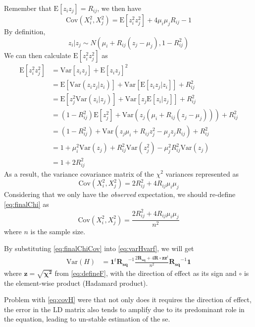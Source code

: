 \documentclass{book}
\begin{document}
			Remember that $\mathrm{E}[z_iz_j] = R_{ij}$, we then have
			$$
				\mathrm{Cov}(X_i^2, X_j^2)=\mathrm{E}[z_i^2z_j^2]+4\mu_i\mu_jR_{ij}-1
			$$
			By definition, 
			$$
				z_i|z_j\sim N(\mu_i+R_{ij}(z_j-\mu_j),1-R_{ij}^2)
			$$
			We can then calculate $\mathrm{E}[z_i^2z_j^2]$ as
			\begin{align*}
				\mathrm{E}[z_i^2z_j^2]&=\mathrm{Var}[z_iz_j]+\mathrm{E}[z_iz_j]^2\\
				&=\mathrm{E}[\mathrm{Var}(z_iz_j|z_i)]+\mathrm{Var}[\mathrm{E}[z_iz_j|z_i]]+R_{ij}^2\\
				&=\mathrm{E}[z_j^2\mathrm{Var}(z_i|z_j)]+\mathrm{Var}[z_j\mathrm{E}[z_i|z_j]]+R_{ij}^2\\
				&=(1-R_{ij}^2)\mathrm{E}[z_j^2]+\mathrm{Var}(z_j(\mu_i+R_{ij}(z_j-\mu_j)))+R_{ij}^2\\
				&=(1-R_{ij}^2)+\mathrm{Var}(z_j\mu_i+R_{ij}z_j^2-\mu_jz_jR_{ij})+R_{ij}^2\\
				&=1+\mu_i^2\mathrm{Var}(z_j)+R_{ij}^2\mathrm{Var}(z_j^2)-\mu_j^2R_{ij}^2\mathrm{Var}(z_j)\\
				&=1+2R_{ij}^2
			\end{align*}
			As a result, the variance covariance matrix of the $\chi^2$ variances represented as
			\begin{equation}
				\mathrm{Cov}(X_i^2,X_j^2) = 2R_{ij}^2+4R_{ij}\mu_i\mu_j
				\label{eq:finalChi}
			\end{equation}
			Considering that we only have the \emph{observed} expectation, we should re-define \cref{eq:finalChi} as
			\begin{equation}
				\mathrm{Cov}(X_i^2,X_j^2) = \frac{2R_{ij}^2+4R_{ij}\mu_i\mu_j}{n^2}
				\label{eq:finalChiCov}
			\end{equation}
			where $n$ is the sample size.
			
			By substituting \cref{eq:finalChiCov} into \cref{eq:varHvarf}, we will get
			\begin{align}
				\mathrm{Var}(H) &=\boldsymbol{1}^t\boldsymbol{R_{sq}}^{-1}\frac{2\boldsymbol{R_{sq}}+4\boldsymbol{R}\circ \boldsymbol{zz}^t}{n^2}\boldsymbol{R_{sq}}^{-1}\boldsymbol{1}
				\label{eq:covH}
			\end{align}
			where $\boldsymbol{z} = \sqrt{\boldsymbol{\chi^2}}$ from \cref{eq:defineF}, with the direction of effect as its sign and $\circ$ is the element-wise product (Hadamard product).
			 
			Problem with \cref{eq:covH} were that not only does it requires the direction of effect, the error in the \gls{LD} matrix also tends to amplify due to its predominant role in the equation, leading to un-stable estimation of the \gls{se}.
			 
\end{document}
